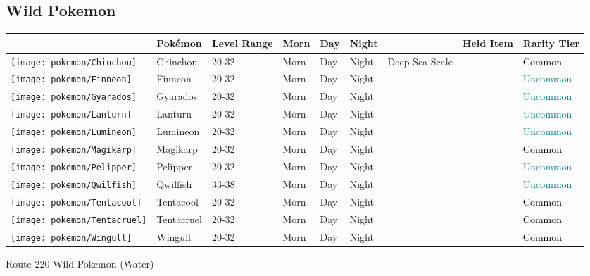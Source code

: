 \subsection{Wild Pokemon}%
\label{subsec:WildPokemon}%
\begin{longtable}{||l l l l l l l l l||}%
\hline%
&Pokémon&Level Range&Morn&Day&Night&&Held Item&Rarity Tier\\%
\hline%
\endhead%
\hline%
\texttt{[image: pokemon/Chinchou]}&Chinchou&20{-}32&Morn&Day&Night&Deep Sea Scale&&\textcolor{black}{%
Common%
}\\%
\hline%
\texttt{[image: pokemon/Finneon]}&Finneon&20{-}32&Morn&Day&Night&&&\textcolor{teal}{%
Uncommon%
}\\%
\hline%
\texttt{[image: pokemon/Gyarados]}&Gyarados&20{-}32&Morn&Day&Night&&&\textcolor{teal}{%
Uncommon%
}\\%
\hline%
\texttt{[image: pokemon/Lanturn]}&Lanturn&20{-}32&Morn&Day&Night&&&\textcolor{teal}{%
Uncommon%
}\\%
\hline%
\texttt{[image: pokemon/Lumineon]}&Lumineon&20{-}32&Morn&Day&Night&&&\textcolor{teal}{%
Uncommon%
}\\%
\hline%
\texttt{[image: pokemon/Magikarp]}&Magikarp&20{-}32&Morn&Day&Night&&&\textcolor{black}{%
Common%
}\\%
\hline%
\texttt{[image: pokemon/Pelipper]}&Pelipper&20{-}32&Morn&Day&Night&&&\textcolor{teal}{%
Uncommon%
}\\%
\hline%
\texttt{[image: pokemon/Qwilfish]}&Qwilfish&33{-}38&Morn&Day&Night&&&\textcolor{teal}{%
Uncommon%
}\\%
\hline%
\texttt{[image: pokemon/Tentacool]}&Tentacool&20{-}32&Morn&Day&Night&&&\textcolor{black}{%
Common%
}\\%
\hline%
\texttt{[image: pokemon/Tentacruel]}&Tentacruel&20{-}32&Morn&Day&Night&&&\textcolor{black}{%
Common%
}\\%
\hline%
\texttt{[image: pokemon/Wingull]}&Wingull&20{-}32&Morn&Day&Night&&&\textcolor{black}{%
Common%
}\\%
\hline%
\end{longtable}%
\caption{Route 220 Wild Pokemon (Water)}